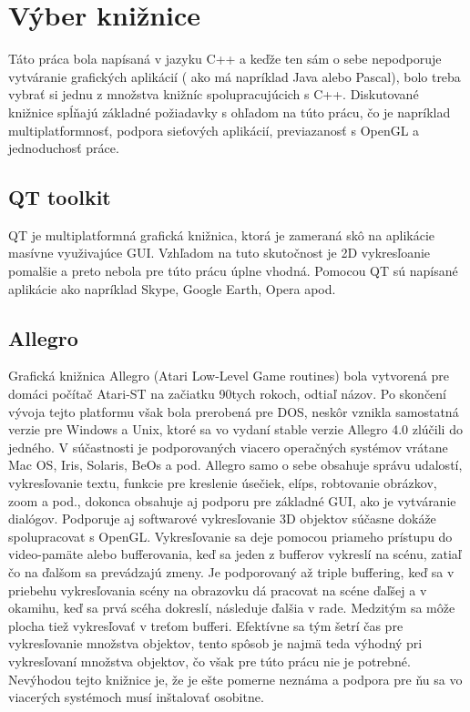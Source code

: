 \section {Výber knižnice}
Táto práca bola napísaná v jazyku C++ a keďže ten sám o sebe nepodporuje vytváranie grafických aplikácií ( ako má napríklad Java alebo Pascal), bolo treba vybrať si jednu z množstva knižníc spolupracujúcich s C++. Diskutované knižnice spĺňajú základné požiadavky s ohľadom na túto prácu, čo je napríklad multiplatformnosť, podpora sieťových aplikácií, previazanosť s OpenGL a jednoduchosť práce.
\subsection{QT toolkit}
QT je multiplatformná grafická knižnica, ktorá je zameraná skô na aplikácie masívne využivajúce GUI. Vzhľadom na tuto skutočnost je 2D vykresľoanie pomalšie a preto nebola pre túto prácu úplne vhodná.
Pomocou QT sú napísané aplikácie ako napríklad Skype, Google Earth, Opera apod.
\subsection{Allegro}
Grafická knižnica Allegro (Atari Low-Level Game routines) bola vytvorená pre domáci počítač Atari-ST na začiatku 90tych rokoch, odtiaľ názov. Po skončení vývoja tejto platformu však bola prerobená pre DOS, neskôr vznikla samostatná verzie pre Windows a Unix, ktoré sa vo vydaní stable verzie Allegro 4.0 zlúčili do jedného. V súčastnosti je podporovaných viacero operačných systémov vrátane Mac OS, Iris, Solaris, BeOs a pod.
Allegro samo o sebe obsahuje správu udalostí, vykresľovanie textu, funkcie pre kreslenie úsečiek, elíps, robtovanie obrázkov, zoom a pod., dokonca obsahuje aj podporu pre základné GUI, ako je vytváranie dialógov. Podporuje aj softwarové vykresľovanie 3D objektov súčasne dokáže spolupracovat s OpenGL. Vykresľovanie sa deje pomocou priameho prístupu do video-pamäte alebo bufferovania, keď sa jeden z bufferov vykreslí na scénu, zatiaľ čo na ďalšom sa prevádzajú zmeny. Je podporovaný až triple buffering, keď sa v priebehu vykresľovania scény na obrazovku dá pracovat na scéne ďaľšej a v okamihu, keď sa prvá scéha dokreslí, následuje ďalšia v rade. Medzitým sa môže plocha tiež vykresľovať v treťom bufferi. Efektívne sa tým šetrí čas pre vykresľovanie množstva objektov, tento spôsob je najmä teda výhodný pri vykresľovaní množstva objektov, čo však pre túto prácu nie je potrebné.
\indent
Nevýhodou tejto knižnice je, že je ešte pomerne neznáma a podpora pre ňu sa vo viacerých systémoch musí inštalovať osobitne. %
